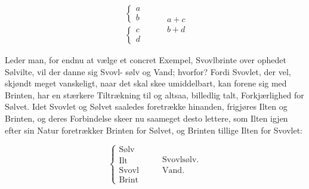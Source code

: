 \documentclass[12pt,a4paper]{book}
\begin{document}
\[
\begin{array}{l}
\left\lbrace \begin{array}{l} a \\ b \end{array}\right. \\
\left\lbrace \begin{array}{l} c \\ d \end{array}\right.
\end{array}
\qquad
\begin{array}{l} a + c \\ b + d \end{array}
\]

Leder man, for endnu at vælge et concret Exempel, Svovlbrinte
over ophedet Sølvilte, vil der danne sig Svovl-
\setcounter{footnote}{0}
sølv og Vand; hvorfor? Fordi Svovlet, der vel, skjøndt meget
vanskeligt, naar det skal skee umiddelbart, kan forene sig med
Brinten, har en stærkere Tiltrækning til og altsaa, billedlig talt,
Forkjærlighed for Sølvet. Idet Svovlet og Sølvet saaledes
foretrække hinanden, frigjøres Ilten og Brinten, og deres
Forbindelse skeer nu saameget desto lettere, som Ilten igjen efter
sin Natur foretrækker Brinten for Sølvet, og Brinten tillige Ilten
for Svovlet:

\[
\left\lbrace \begin{array}{l}
\mbox{Sølv} \\ \mbox{Ilt} \\ \mbox{Svovl} \\ \mbox{Brint}
\end{array}\right.
\qquad
\begin{array}{l} \mbox{Svovlsølv.} \\ \mbox{Vand.} \end{array}
\]
\end{document}
